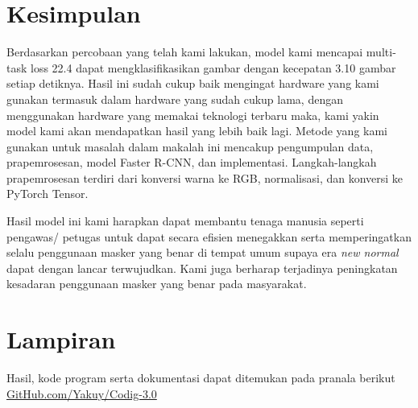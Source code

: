 \documentclass{article}
\begin{document}
  	\section{Kesimpulan}
	  \par Berdasarkan percobaan yang telah kami lakukan, model kami mencapai multi-task loss 22.4 dapat mengklasifikasikan gambar dengan kecepatan 3.10 gambar setiap detiknya. Hasil ini sudah cukup baik mengingat hardware yang kami gunakan termasuk dalam hardware yang sudah cukup lama, dengan menggunakan hardware yang memakai teknologi terbaru maka, kami yakin model kami akan mendapatkan hasil yang lebih baik lagi. Metode yang kami gunakan untuk masalah dalam makalah ini mencakup pengumpulan data, prapemrosesan, model Faster R-CNN, dan implementasi. Langkah-langkah prapemrosesan terdiri dari konversi warna ke RGB, normalisasi, dan konversi ke PyTorch Tensor.
	  
	  \par Hasil model ini kami harapkan dapat membantu tenaga manusia seperti pengawas/ petugas untuk dapat secara efisien menegakkan serta memperingatkan selalu penggunaan masker yang benar di tempat umum supaya era \textit{new normal} dapat dengan lancar terwujudkan. Kami juga berharap terjadinya peningkatan kesadaran penggunaan masker yang benar pada masyarakat.

	
  	
  \section{Lampiran}
  \noindent Hasil, kode program serta dokumentasi dapat ditemukan pada pranala berikut\\
  \href{https://github.com/Yakuy/Codig-3.0}{GitHub.com/Yakuy/Codig-3.0}\\

  \newpage
  \printbibliography[title={Referensi}]
\end{document}
